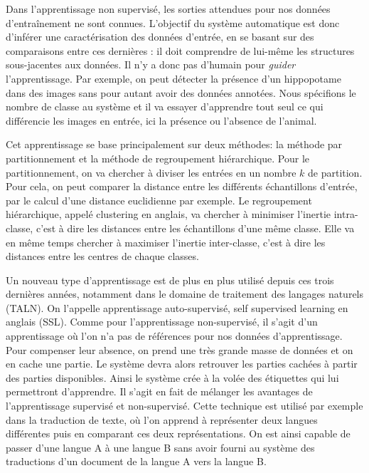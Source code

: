 
Dans l'apprentissage non supervisé, les sorties attendues pour nos données d’entraînement ne sont connues. L'objectif du système automatique est donc d'inférer une caractérisation des données d'entrée, en se basant sur des comparaisons entre ces dernières : il doit comprendre de lui-même les structures sous-jacentes aux données. Il n'y a donc pas d'humain pour \textit{guider} l'apprentissage. Par exemple, on peut détecter la présence d'un hippopotame dans des images sans pour autant avoir des données annotées. Nous spécifions le nombre de classe au système et il va essayer d'apprendre tout seul ce qui différencie les images en entrée, ici la présence ou l'absence de l'animal.

Cet apprentissage se base principalement sur deux méthodes: la méthode par partitionnement et la méthode de regroupement hiérarchique. Pour le partitionnement, on va chercher à diviser les entrées en un nombre $k$ de partition. Pour cela, on peut comparer la distance entre les différents échantillons d'entrée, par le calcul d'une distance euclidienne par exemple. Le regroupement hiérarchique, appelé clustering en anglais, va chercher à minimiser l'inertie intra-classe, c'est à dire les distances entre les échantillons d'une même classe. Elle va en même temps chercher à maximiser l'inertie inter-classe, c'est à dire les distances entre les centres de chaque classes. %

Un nouveau type d'apprentissage est de plus en plus utilisé depuis ces trois dernières années, notamment dans le domaine de traitement des langages naturels (TALN). On l'appelle apprentissage auto-supervisé, self supervised learning en anglais (SSL). Comme pour l'apprentissage non-supervisé, il s'agit d'un apprentissage où l'on n'a pas de références pour nos données d'apprentissage. Pour compenser leur absence, on prend une très grande masse de données et on en cache une partie. Le système devra alors retrouver les parties cachées à partir des parties disponibles. Ainsi le système crée à la volée des étiquettes qui lui permettront d'apprendre. Il s'agit en fait de mélanger les avantages de l'apprentissage supervisé et non-supervisé.
Cette technique est utilisé par exemple dans la traduction de texte, où l'on apprend à représenter deux langues différentes puis en comparant ces deux représentations. On est ainsi capable de passer d'une langue A à une langue B sans avoir fourni au système des traductions d'un document de la langue A vers la langue B.


